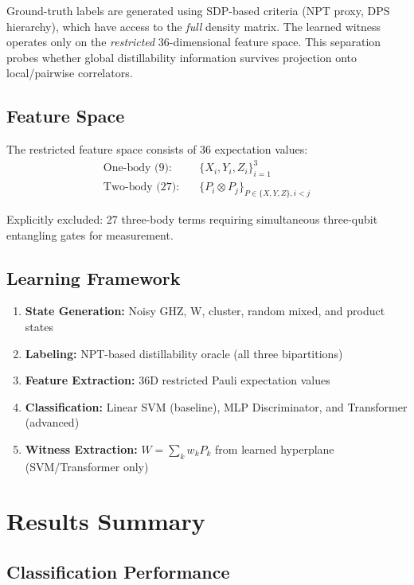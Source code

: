 \documentclass[11pt,a4paper]{article}
\begin{document}
Ground-truth labels are generated using SDP-based criteria (NPT proxy, DPS hierarchy), which have access to the \emph{full} density matrix. The learned witness operates only on the \emph{restricted} 36-dimensional feature space. This separation probes whether global distillability information survives projection onto local/pairwise correlators.

\subsection{Feature Space}

The restricted feature space consists of 36 expectation values:
\begin{align}
\text{One-body (9):} \quad & \{X_i, Y_i, Z_i\}_{i=1}^{3} \\
\text{Two-body (27):} \quad & \{P_i \otimes P_j\}_{P \in \{X,Y,Z\}, i<j}
\end{align}

Explicitly excluded: 27 three-body terms requiring simultaneous three-qubit entangling gates for measurement.

\subsection{Learning Framework}

\begin{enumerate}
    \item \textbf{State Generation:} Noisy GHZ, W, cluster, random mixed, and product states
    \item \textbf{Labeling:} NPT-based distillability oracle (all three bipartitions)
    \item \textbf{Feature Extraction:} 36D restricted Pauli expectation values
    \item \textbf{Classification:} Linear SVM (baseline), MLP Discriminator, and Transformer (advanced)
    \item \textbf{Witness Extraction:} $W = \sum_k w_k P_k$ from learned hyperplane (SVM/Transformer only)
\end{enumerate}

\section{Results Summary}

\subsection{Classification Performance}
\end{document}
